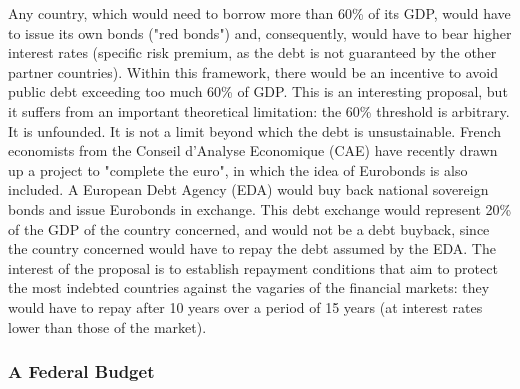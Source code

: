 \documentclass[12pt]{article}
\begin{document}
 Any country, which would need to borrow more than 60\% of its GDP, would have to issue its own bonds ("red bonds") and, consequently, would have to bear higher interest rates (specific risk premium, as the debt is not guaranteed by the other partner countries). Within this framework, there would be an incentive to avoid public debt exceeding too much 60\% of GDP. This is an interesting proposal, but it suffers from an important theoretical limitation: the 60\% threshold is arbitrary. It is unfounded. It is not a limit beyond which the debt is unsustainable. French economists from the Conseil d'Analyse Economique (CAE) have recently drawn up a project to "complete the euro", in which the idea of Eurobonds is also included. A European Debt Agency (EDA) would buy back national sovereign bonds and issue Eurobonds in exchange. This debt exchange would represent 20\% of the GDP of the country concerned, and would not be a debt buyback, since the country concerned would have to repay the debt assumed by the EDA. The interest of the proposal is to establish repayment conditions that aim to protect the most indebted countries against the vagaries of the financial markets: they would have to repay after 10 years over a period of 15 years (at interest rates lower than those of the market).

\subsubsection{A Federal Budget}
\end{document}
